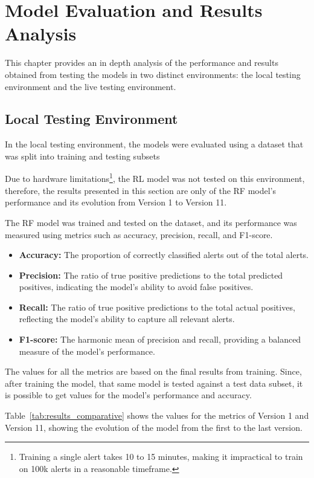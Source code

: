 \chapter{Model Evaluation and Results Analysis}
\label{chap:Chapter4}

This chapter provides an in depth analysis of the performance and results obtained from testing the models in two distinct environments: the local testing environment and the live testing environment.

\section{Local Testing Environment}

In the local testing environment, the models were evaluated using a dataset that was split into training and testing subsets

Due to hardware limitations\footnote{Training a single alert takes 10 to 15 minutes, making it impractical to train on 100k alerts in a reasonable timeframe.}, the RL model was not tested on this environment, therefore, the results presented in this section are only of the RF model's performance and its evolution from Version 1 to Version 11.

The RF model was trained and tested on the dataset, and its performance was measured using metrics such as accuracy, precision, recall, and F1-score.
\begin{itemize}
    \item \textbf{Accuracy:} The proportion of correctly classified alerts out of the total alerts.
    \item \textbf{Precision:} The ratio of true positive predictions to the total predicted positives, indicating the model's ability to avoid false positives.
    \item \textbf{Recall:} The ratio of true positive predictions to the total actual positives, reflecting the model's ability to capture all relevant alerts.
    \item \textbf{F1-score:} The harmonic mean of precision and recall, providing a balanced measure of the model's performance.
\end{itemize}

The values for all the metrics are based on the final results from training. 
Since, after training the model, that same model is tested against a test data subset, it is possible to get values for the model's performance and accuracy.

Table~\ref{tab:results_comparative} shows the values for the metrics of Version 1 and Version 11, showing the evolution of the model from the first to the last version.

